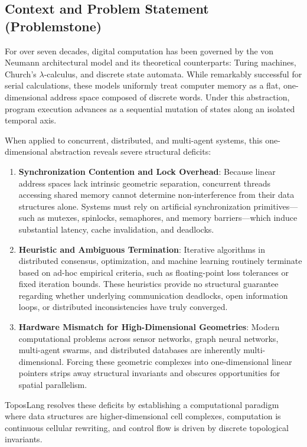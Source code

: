 \documentclass[10pt,a4paper]{article}
\begin{document}
\subsection{Context and Problem Statement (Problemstone)}
For over seven decades, digital computation has been governed by the von Neumann architectural model and its theoretical counterparts: Turing machines, Church's $\lambda$-calculus, and discrete state automata. While remarkably successful for serial calculations, these models uniformly treat computer memory as a flat, one-dimensional address space composed of discrete words. Under this abstraction, program execution advances as a sequential mutation of states along an isolated temporal axis.

When applied to concurrent, distributed, and multi-agent systems, this one-dimensional abstraction reveals severe structural deficits:
\begin{enumerate}
    \item \textbf{Synchronization Contention and Lock Overhead}: Because linear address spaces lack intrinsic geometric separation, concurrent threads accessing shared memory cannot determine non-interference from their data structures alone. Systems must rely on artificial synchronization primitives---such as mutexes, spinlocks, semaphores, and memory barriers---which induce substantial latency, cache invalidation, and deadlocks.
    \item \textbf{Heuristic and Ambiguous Termination}: Iterative algorithms in distributed consensus, optimization, and machine learning routinely terminate based on ad-hoc empirical criteria, such as floating-point loss tolerances or fixed iteration bounds. These heuristics provide no structural guarantee regarding whether underlying communication deadlocks, open information loops, or distributed inconsistencies have truly converged.
    \item \textbf{Hardware Mismatch for High-Dimensional Geometries}: Modern computational problems across sensor networks, graph neural networks, multi-agent swarms, and distributed databases are inherently multi-dimensional. Forcing these geometric complexes into one-dimensional linear pointers strips away structural invariants and obscures opportunities for spatial parallelism.
\end{enumerate}

ToposLang resolves these deficits by establishing a computational paradigm where data structures are higher-dimensional cell complexes, computation is continuous cellular rewriting, and control flow is driven by discrete topological invariants.
\end{document}
